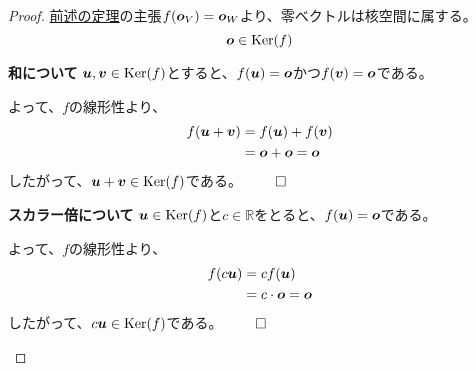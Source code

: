 \documentclass[../../../topic_linear-algebra]{subfiles}
\begin{document}
\begin{proof}
  \hyperref[thm:linear-map-zero-preserving]{前述の定理}の主張$f(\vb*{o}_V) = \vb*{o}_W$より、零ベクトルは核空間に属する。
  \begin{equation*}
    \vb*{o} \in \operatorname{Ker}(f)
  \end{equation*}

  \begin{subpattern}{\bfseries 和について}
    $\vb*{u}, \vb*{v} \in \operatorname{Ker}(f)$とすると、$f(\vb*{u}) = \vb*{o}$かつ$f(\vb*{v}) = \vb*{o}$である。

    よって、$f$の線形性より、
    \begin{align*}
      f(\vb*{u} + \vb*{v}) & = f(\vb*{u}) + f(\vb*{v})     \\
                           & = \vb*{o} + \vb*{o} = \vb*{o}
    \end{align*}
    したがって、$\vb*{u} + \vb*{v} \in \operatorname{Ker}(f)$である。 $\qed$
  \end{subpattern}

  \begin{subpattern}{\bfseries スカラー倍について}
    $\vb*{u} \in \operatorname{Ker}(f)$と$c \in \mathbb{R}$をとると、$f(\vb*{u}) = \vb*{o}$である。

    よって、$f$の線形性より、
    \begin{align*}
      f(c \vb*{u}) & = c f(\vb*{u})              \\
                   & = c \cdot \vb*{o} = \vb*{o}
    \end{align*}
    したがって、$c \vb*{u} \in \operatorname{Ker}(f)$である。 $\qed$
  \end{subpattern}
\end{proof}
\end{document}
